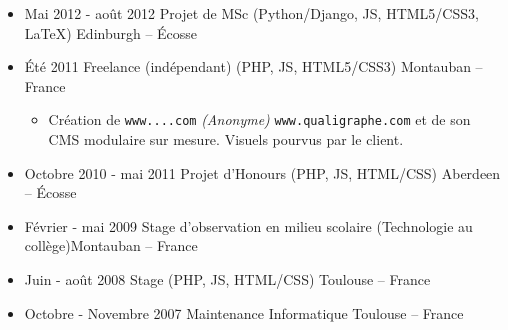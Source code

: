 \documentclass{res}
\begin{document}
\begin{resume}
\begin{itemize}
		\begin{itemize}
			\item[] \'Equipe de R\'eplication des Donn\'ees, d\'epartement Middleware d'\textbf{Amadeus}. Ax\'e R\&D, j'ai travaill\'e sur :
			\begin{itemize}
				\item[+] l'am\'elioration de performances g\'en\'erales (r\'eseau, bases de donn\'ees, algorithmie).
				\item[+] la r\'eplication de donn\'ees \`a travers des milliers de n\oe{}uds. Donn\'ees statiques, ou extr\^emement dynamiques.
				\item[+] la conception et l'impl\'ementation de types abstraits cohérents pour relier Oracle $\rightleftarrows$ C++ $\rightleftarrows$ Sqlite $\rightleftarrows$ Python.
				\item[+] divers scripts pour prototyper, acc\'el\'erer ou automatiser des t\^aches : stockage~/ r\'ecup\'eration~/ backup\textellipsis
				\item[+] l'export de donn\'ees depuis nos caches vers deux it\'erations successives de XMLs, en g\'en\'erant des XSLTs et des XSDs \`a partir de meta-XSLTs. Cela nous a permis de publier du XML avec diff\'erentes versions de schemas.
				\item[+] la conception et l'impl\'ementation d'un algorithme de Hepburn modifi\'e pour la translitt\'eration du japonais.
				\item[+] la d\'ecommission de commandes de terminaux depuis TPF (IBM) vers une nouvelle architecture en C++.
			\end{itemize}
		\end{itemize}
		\item[] Mai 2012 - ao\^ut 2012 \tabto{5cm} Projet de MSc (Python/Django, JS, HTML5/CSS3, \LaTeX{}) \hfill Edinburgh -- \'Ecosse
		\item[] \'Et\'e 2011 \tabto{5cm} Freelance (ind\'ependant) (PHP, JS, HTML5/CSS3) \hfill Montauban -- France
		\begin{itemize}
			\item[] Cr\'eation de \ifisanon \texttt{www....com} \textit{(Anonyme)} \else \texttt{www.qualigraphe.com} \fi et de son CMS modulaire sur mesure. Visuels pourvus par le client.
		\end{itemize}
		\item[] Octobre 2010 - mai 2011 \tabto{5cm} Projet d'Honours (PHP, JS, HTML/CSS) \hfill Aberdeen -- \'Ecosse
		\item[] F\'evrier - mai 2009 \tabto{5cm} Stage d'observation en milieu scolaire (Technologie au coll\`ege)\hfill Montauban -- France
		\item[] Juin - ao\^ut 2008 \tabto{5cm} Stage (PHP, JS, HTML/CSS) \hfill Toulouse -- France
		\item[] Octobre - Novembre 2007 \tabto{5cm} Maintenance Informatique \hfill Toulouse -- France
	\end{itemize}
		

\end{resume}
\end{document}
